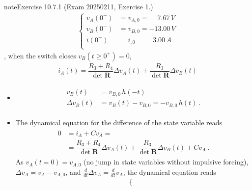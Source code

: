 \documentclass[letterpaper,10pt,italian]{jupyterBook}
\begin{document}
\begin{sphinxadmonition}{note}{Exercise 10.7.1 (Exam 2025\sphinxhyphen{}02\sphinxhyphen{}11, Exercise 1.)}
\begin{equation*}
\begin{split}\begin{cases}
  v_A(0^-) & = v_{A,0} = \quad\ 7.67 \, V \\
  v_B(0^-) & = v_{B,0} =      -13.00 \, V \\
    i(0^-) & = i_{ ,0} = \quad\ 3.00 \, A \\
\end{cases}\end{split}
\end{equation*}
\sphinxAtStartPar
{}, when the switch closes \(v_B(t \ge 0^+) = 0\),
\begin{equation*}
\begin{split}i_A(t) = \dfrac{R_3 + R_4}{\det \mathbf{R}} \Delta v_A(t) + \dfrac{R_3}{\det \mathbf{R}} \Delta v_B(t)\end{split}
\end{equation*}\begin{itemize}
\item {} 
\sphinxAtStartPar
{}
\begin{equation*}
\begin{split}\begin{aligned}
     v_{B}(t) & = v_{B,0} \, h(-t) \\
     \Delta v_{B}(t) & = v_B(t) - v_{B,0} = - v_{B,0} \, h(t) \ . 
   \end{aligned}\end{split}
\end{equation*}
\item {} 
\sphinxAtStartPar
{} The dynamical equation for the difference of the state variable reads
\begin{equation*}
\begin{split}\begin{aligned}
     0 & = i_A + C \dot{v}_A = \\
       & = \dfrac{R_3 + R_4}{\det \mathbf{R}} \Delta v_A(t) + \dfrac{R_3}{\det \mathbf{R}} \Delta v_B(t) + C \dot{v}_A \ .
   \end{aligned}\end{split}
\end{equation*}
\sphinxAtStartPar
As \(v_{A}(t=0) = v_{A,0}\) (no jump in state variables without impulsive forcing), \(\Delta v_A = v_A - v_{A,0}\), and \(\frac{d}{dt} \Delta v_A = \frac{d}{dt} v_A\), the dynamical equation reads
\begin{equation*}
\begin{split}\begin{cases}

\end{cases}
\end{split}
\end{equation*}
\end{itemize}
\end{sphinxadmonition}
\end{document}
